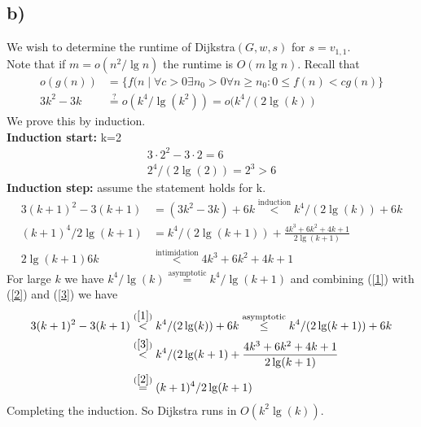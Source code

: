 \documentclass{article}
\theoremstyle{remark}
\numberwithin{equation}{section}
\begin{document}
	\subsection{b)}
	We wish to determine the runtime of Dijkstra$(G,w,s)$ for $s=v_{1,1}$.\\
	Note that if $m = o(n^2/\lg n)$ the runtime is $O(m\lg n)$. Recall that
	\begin{align*}
		o(g(n)) &= \{ f(n \mid \forall c>0 \exists n_0 >0 \forall n\geq n_0 : 0\leq f(n) < cg(n) \}\\
		3k^2-3k &\stackrel{?}{=} o(k^4/\lg(k^2)) = o(k^4/(2\lg(k))
	\end{align*}
	We prove this by induction.\\
	\textbf{Induction start:} k=2\\
	\begin{align*}
		3\cdot 2^2 -3\cdot 2 = 6\\
		2^4/(2\lg(2)) = 2^3 > 6
	\end{align*}
	\textbf{Induction step:} assume the statement holds for k.
	\begin{align}
		3(k+1)^2-3(k+1) &= (3k^2-3k)+6k \stackrel{\text{induction}}{<} k^4/(2\lg(k)) + 6k\label{1}\\
		(k+1)^4/2\lg(k+1) &= k^4/(2\lg(k+1))+\frac{4k^3+6k^2+4k+1}{2\lg(k+1)}\label{2}\\
		2\lg(k+1)6k &\stackrel{\text{intimidation}}{<} 4k^3+6k^2+4k+1\label{3}
	\end{align}
	For large $k$ we have $k^4/\lg(k) \stackrel{\text{asymptotic}}{=} k^4/\lg(k+1)$ and combining (\ref{1}) with (\ref{2}) and (\ref{3}) we have
	\begin{align*}
		3(k+1)^2-3(k+1) &\stackrel{(\ref{1})}{<} k^4/(2\lg(k))+6k \stackrel{\text{asymptotic}}{\leq} k^4/(2\lg(k+1)) +6k\\
		&\stackrel{(\ref{3})}{<} k^4/(2\lg(k+1) + \frac{4k^3+6k^2+4k+1}{2\lg(k+1)}\\
		&\stackrel{(\ref{2})}{=} (k+1)^4/2\lg(k+1)
	\end{align*}
	Completing the induction. So Dijkstra runs in $O(k^2\lg(k))$.
\end{document}
